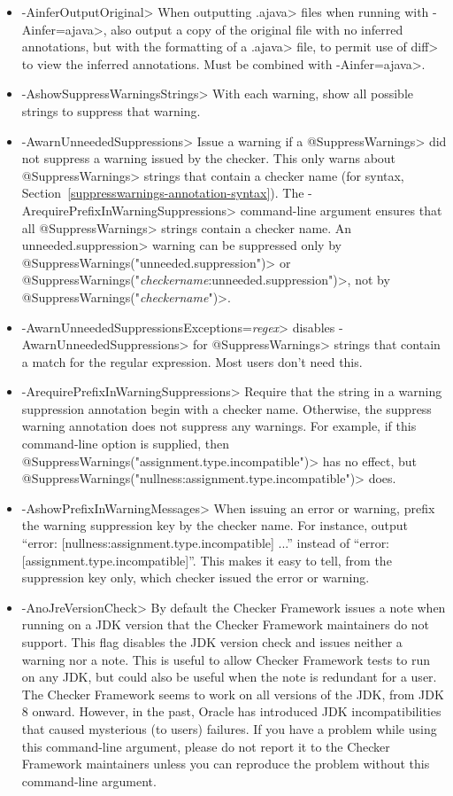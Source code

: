 \begin{itemize}
  a build system directory (e.g., \<\$HOME/.gradle/workers>) rather than the
  project root directory, so you may need to provide an absolute path.
\item \<-AinferOutputOriginal>
  When outputting \<.ajava> files when running with \<-Ainfer=ajava>,
  also output a copy of the original file with no inferred annotations,
  but with the formatting of a \<.ajava> file, to permit use of \<diff>
  to view the inferred annotations. Must be combined with \<-Ainfer=ajava>.
\item \<-AshowSuppressWarningsStrings>
  With each warning, show all possible strings to suppress that warning.
\item \<-AwarnUnneededSuppressions>
  Issue a warning if a \<@SuppressWarnings> did not suppress a warning
  issued by the checker.  This only warns about
  \<@SuppressWarnings> strings that contain a checker name
  (for syntax, Section~\ref{suppresswarnings-annotation-syntax}).  The
  \<-ArequirePrefixInWarningSuppressions> command-line argument ensures
  that all \<@SuppressWarnings> strings contain a checker name.
  An \<unneeded.suppression> warning can be suppressed only by
  \<@SuppressWarnings("unneeded.suppression")>
  or \<@SuppressWarnings("\emph{checkername}:unneeded.suppression")>,
  not by \<@SuppressWarnings("\emph{checkername}")>.
\item \<-AwarnUnneededSuppressionsExceptions=\emph{regex}> disables
  \<-AwarnUnneededSuppressions> for \<@SuppressWarnings> strings that
  contain a match for the regular expression.  Most users don't need this.
\item \<-ArequirePrefixInWarningSuppressions>
  Require that the string in a warning suppression annotation begin with a checker
  name.  Otherwise, the suppress warning annotation does not
  suppress any warnings.  For example, if this command-line option is
  supplied, then \<@SuppressWarnings("assignment.type.incompatible")> has no effect, but
  \<@SuppressWarnings("nullness:assignment.type.incompatible")> does.
\item \<-AshowPrefixInWarningMessages>
  When issuing an error or warning, prefix the warning suppression key by
  the checker name.  For instance, output
  ``error: [nullness:assignment.type.incompatible] ...'' instead of
  ``error: [assignment.type.incompatible]''.  This makes it easy to tell,
  from the suppression key only, which checker issued the error or warning.
\item \<-AnoJreVersionCheck>
  By default the Checker Framework issues a note when running on a JDK
  version that the Checker Framework maintainers do not support.
  This flag disables the JDK version check and issues neither a warning nor
  a note. This is useful to allow Checker Framework tests to run on any
  JDK, but could also be useful when the note is redundant for a
  user.
  The Checker Framework seems to work on all versions of the JDK, from JDK
  8 onward.  However, in the past, Oracle has introduced JDK
  incompatibilities that caused mysterious (to users) failures.  If you
  have a problem while using this command-line argument, please do not
  report it to the Checker Framework maintainers unless you can reproduce
  the problem without this command-line argument.


\end{itemize}
